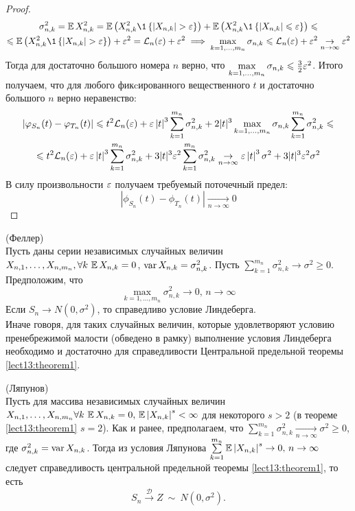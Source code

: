 \begin{proof}
\begin{multline*}
\sigma_{n, k}^2 = \E X_{n,k}^2 = \E\left(X_{n, k} ^2 \1\left\{\left|X_{n, k}\right| > \eps\right\}\right) + \E\left(X_{n, k} ^2 \1\left\{\left|X_{n, k}\right| \leqslant \eps\right\}\right) \leqslant
\\
\leqslant \E\left(X_{n, k} ^2 \1\left\{\left|X_{n, k}\right| > \eps\right\}\right) + \eps^2 = \mathcal{L}_n(\eps) + \eps^2 \implies \max_{k = 1, \ldots, m_n}\sigma_{n, k} \leqslant \mathcal{L}_n(\eps) + \eps^2 \underset{n \to \infty}{\to} \eps^2
\end{multline*}
Тогда для достаточно большого номера $n$ верно, что $\max\limits_{k = 1, \ldots, m_n}\sigma_{n, k} \leqslant \frac{3}{2}\varepsilon^2$.
Итого получаем, что для любого фикcированного вещественного $t$ и достаточно большого $n$ верно неравенство:
\begin{multline*}
\left|\varphi_{S_n}(t) - \varphi_{T_n}(t)\right| \leqslant t^2\mathcal{L}_n(\varepsilon) + \varepsilon\left|t\right|^3\sum_{k = 1}^{m_n}\sigma_{n, k}^2 + 2|t|^3\max_{k = 1, \ldots, m_n}\sigma_{n, k}\sum_{k = 1}^{m_n}\sigma_{n, k}^2 \leqslant
\\
 \leqslant t^2\mathcal{L}_n(\varepsilon) + \varepsilon\left|t\right|^3\sum_{k = 1}^{m_n}\sigma_{n, k}^2 + 3|t|^3\varepsilon^2\sum_{k = 1}^{m_n}\sigma_{n, k}^2 \underset{n \to \infty}{\to} \varepsilon\left|t\right|^3\sigma^2 + 3|t|^3\varepsilon^2\sigma^2
\end{multline*}
В силу произвольности $\varepsilon$ получаем требуемый поточечный предел:
$$
\left|\phi_{S_n}(t) - \phi_{T_n}(t)\right| \underset{n \to \infty}{\to} 0
$$
\end{proof}
\begin{theorem}\label{lect13:theorem2}(Феллер)\\
Пусть даны серии независимых случайных величин $X_{n, 1}, \ldots, X_{n, m_n}, \\ \forall k \,\operatorname*{\mathbb{E}} X_{n,k} = 0$, $\operatorname*{var} X_{n,k} = \sigma_{n, k}^2$. Пусть $\sum\limits_{k = 1}^{m_n}\sigma_{n, k}^2 \to \sigma^2 \geqslant 0$. Предположим, что
$$
\boxed{\max\limits_{k = 1, \ldots, m_n}\sigma_{n, k}^2 \to 0, \, n\to\infty}
$$
Если $S_n \to N(0, \sigma^2)$, то справедливо условие Линдеберга.\\
Иначе говоря, для таких случайных величин, которые удовлетворяют условию пренебрежимой малости (обведено в рамку) выполнение условия Линдеберга необходимо и достаточно для справедливости Центральной предельной теоремы \ref{lect13:theorem1}.
\end{theorem}
\begin{theorem}\label{lect13:theorem3}(Ляпунов)\\
Пусть для массива независимых случайных величин $X_{n, 1}, \ldots, X_{n, m_n}\\ \forall k \,\operatorname*{\mathbb{E}} X_{n,k} = 0,\, \operatorname*{\mathbb{E}} \left|X_{n,k}\right|^s < \infty$ для некоторого $s > 2$ (в теореме \ref{lect13:theorem1} $s = 2$). Как и ранее, предполагаем, что $\sum\limits_{k = 1}^{m_n} \sigma_{n, k}^2 \underset{n \to \infty}{\to} \sigma^2 \geqslant 0$, где $\sigma_{n, k}^2 = \operatorname*{var} X_{n, k}$. Тогда из условия Ляпунова $\sum\limits_{k = 1}^{m_n}\operatorname*{\mathbb{E}} \left|X_{n, k}\right|^s \to 0, \, n \to \infty$ следует справедливость центральной предельной теоремы \ref{lect13:theorem1}, то есть
$$
S_n \overset{\mathcal{D}}{\to} Z~\sim~N(0, \sigma^2).
$$
\end{theorem}
